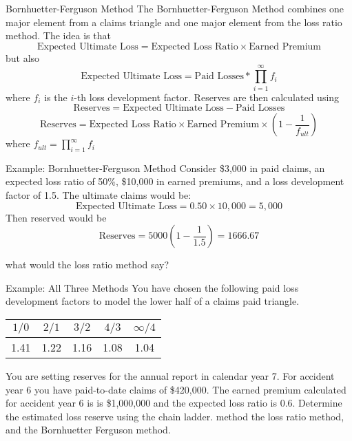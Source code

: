 \documentclass[compress,mathserif]{beamer}
\begin{document}
\begin{frame}{Bornhuetter-Ferguson Method}
    The Bornhuetter-Ferguson Method combines one major element from a claims triangle and one major element from the loss ratio method. The idea is that     \[ \text{Expected Ultimate Loss} = \text{Expected Loss Ratio} \times \text{Earned Premium} \]
    but also 
     \[ \text{Expected Ultimate Loss} = \text{Paid Losses} * \prod_{i = 1}^\infty f_i\]
where $f_i$ is the $i$-th loss development factor. Reserves are then calculated using 
\[ \text{Reserves} = \text{Expected Ultimate Loss} -  \text{Paid Losses}\]
\[\text{Reserves} = \text{Expected Loss Ratio} \times \text{Earned Premium}\times \left(1-\frac{1}{f_{ult}}\right)\] where $f_{ult} =  \prod_{i = 1}^\infty f_i$
    \end{frame}

\begin{frame}{Example: Bornhuetter-Ferguson Method}
    Consider \$3,000 in paid claims, an expected loss ratio of 50\%, \$10,000 in earned premiums, and a loss development factor of 1.5. The ultimate claims would be:
    \[ \text{Expected Ultimate Loss} = 0.50 \times 10,000  = 5,000 \]
Then reserved would be \[\text{Reserves} = 5000 \left( 1 - \frac{1}{1.5}\right) = 1666.67\]

what would the loss ratio method say?
\end{frame}


\begin{frame}{Example: All Three Methods}
You have chosen the following paid loss development factors to model the lower half of a claims paid triangle. 
\begin{table}
\begin{tabular}{ccccc}
$1/0$ & $2/1$ & $3/2$ & $4/3$ & $\infty/4$ \\ \hline
1.41 & 1.22 & 1.16 & 1.08 & 1.04
\end{tabular}
\end{table}

You are setting reserves for the annual report in calendar year 7. For accident year 6 you have paid-to-date claims of \$420,000. The earned premium calculated for accident year 6 is is \$1,000,000 and the expected loss ratio is 0.6. Determine the estimated loss reserve using the chain ladder. method the loss ratio method, and the Bornhuetter Ferguson method. 

\end{frame}
\end{document}
